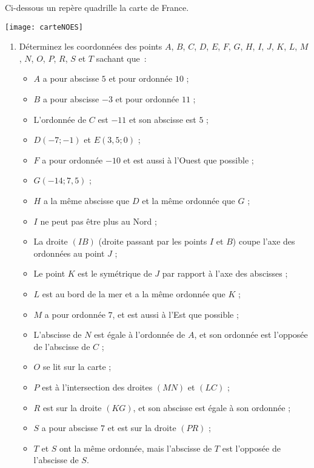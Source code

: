 
\begin{TP}

Ci-dessous un repère quadrille la carte de France.

\begin{center} \texttt{[image: carteNOES]} \end{center}

\begin{enumerate}
 \item Déterminez les coordonnées des points $A$, $B$, $C$, $D$, $E$, $F$, $G$, $H$, $I$, $J$, $K$, $L$, $M$, $N$, $O$, $P$, $R$, $S$ et $T$ sachant que :
 \begin{itemize}
  \item $A$ a pour abscisse $5$ et pour ordonnée $10$ ;
  \item $B$ a pour abscisse $-3$ et pour ordonnée $11$ ;
  \item L'ordonnée de $C$ est $-11$ et son abscisse est $5$ ;
  \item $D(-7 ; -1)$ et $E(3,5 ; 0)$ ;
  \item $F$ a pour ordonnée $-10$ et est aussi à l'Ouest que possible ;
  \item $G(-14 ; 7,5)$ ;
  \item $H$ a la même abscisse que $D$ et la même ordonnée que $G$ ;
  \item $I$ ne peut pas être plus au Nord ;
  \item La droite $(IB)$ (droite passant par les points $I$ et $B$) coupe l'axe des ordonnées au point $J$ ;
  \item Le point $K$ est le symétrique de $J$ par rapport à l'axe des abscisses ;
  \item $L$ est au bord de la mer et a la même ordonnée que $K$ ;
  \item $M$ a pour ordonnée $7$, et est aussi à l'Est que possible ;
  \item L'abscisse de $N$ est égale à l'ordonnée de $A$, et son ordonnée est l'opposée de l'abscisse de $C$ ;
  \item $O$ se lit sur la carte ;
  \item $P$ est à l'intersection des droites $(MN)$ et $(LC)$ ;
  \item $R$ est sur la droite $(KG)$, et son abscisse est égale à son ordonnée ;
  \item $S$ a pour abscisse $7$ et est sur la droite $(PR)$ ;
  \item $T$ et $S$ ont la même ordonnée, mais l'abscisse de $T$ est l'opposée de l'abscisse de $S$.

\end{itemize}
\end{enumerate}
\end{TP}
